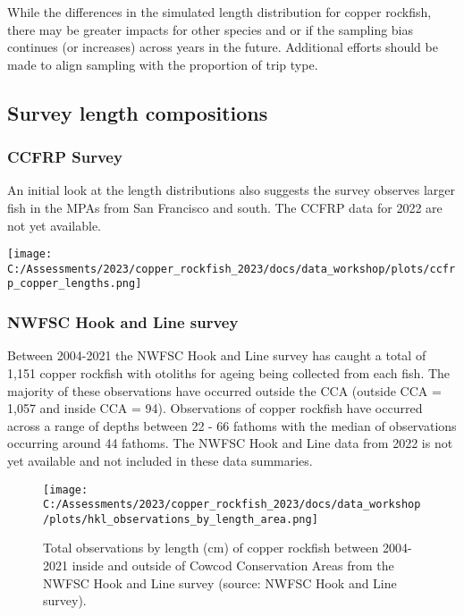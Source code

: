 \documentclass[
]{article}
\begin{document}
While the differences in the simulated length distribution for copper
rockfish, there may be greater impacts for other species and or if the
sampling bias continues (or increases) across years in the future.
Additional efforts should be made to align sampling with the proportion
of trip type.

\hypertarget{survey-length-compositions}{%
\subsection{Survey length
compositions}\label{survey-length-compositions}}

\hypertarget{ccfrp-survey}{%
\subsubsection{CCFRP Survey}\label{ccfrp-survey}}

An initial look at the length distributions also suggests the survey
observes larger fish in the MPAs from San Francisco and south. The CCFRP
data for 2022 are not yet available.

\texttt{[image: C:/Assessments/2023/copper\_rockfish\_2023/docs/data\_workshop/plots/ccfrp\_copper\_lengths.png]}\\

\hypertarget{nwfsc-hook-and-line-survey-1}{%
\subsubsection{NWFSC Hook and Line
survey}\label{nwfsc-hook-and-line-survey-1}}

Between 2004-2021 the NWFSC Hook and Line survey has caught a total of
1,151 copper rockfish with otoliths for ageing being collected from each
fish. The majority of these observations have occurred outside the CCA
(outside CCA = 1,057 and inside CCA = 94). Observations of copper
rockfish have occurred across a range of depths between 22 - 66 fathoms
with the median of observations occurring around 44 fathoms. The NWFSC
Hook and Line data from 2022 is not yet available and not included in
these data summaries.

\begin{figure}
\centering
\texttt{[image: C:/Assessments/2023/copper\_rockfish\_2023/docs/data\_workshop/plots/hkl\_observations\_by\_length\_area.png]}
\caption{Total observations by length (cm) of copper rockfish between
2004-2021 inside and outside of Cowcod Conservation Areas from the NWFSC
Hook and Line survey (source: NWFSC Hook and Line
survey).\label{fig:hkl-length-area}}
\end{figure}
\end{document}
